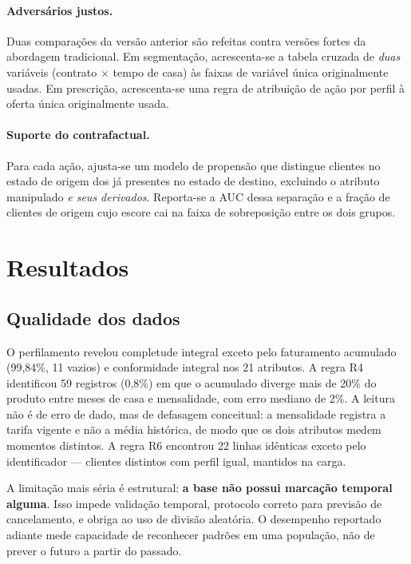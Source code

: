 \documentclass[10pt,a4paper]{article}
\begin{document}
\paragraph{Adversários justos.} Duas comparações da versão anterior são refeitas contra
versões fortes da abordagem tradicional. Em segmentação, acrescenta-se a tabela cruzada
de \emph{duas} variáveis (contrato \(\times\) tempo de casa) às faixas de variável única
originalmente usadas. Em prescrição, acrescenta-se uma regra de atribuição de ação por
perfil à oferta única originalmente usada.

\paragraph{Suporte do contrafactual.}
\label{sec:prescritiva}
Para cada ação, ajusta-se um modelo de propensão que distingue clientes no estado de
origem dos já presentes no estado de destino, excluindo o atributo manipulado \emph{e seus
derivados}. Reporta-se a AUC dessa separação e a fração de clientes de origem cujo escore
cai na faixa de sobreposição entre os dois grupos.

\section{Resultados}
\label{sec:resultados}

\subsection{Qualidade dos dados}

O perfilamento revelou completude integral exceto pelo faturamento acumulado (99,84\%, 11
vazios) e conformidade integral nos 21 atributos. A regra R4 identificou 59 registros (0,8\%)
em que o acumulado diverge mais de 20\% do produto entre meses de casa e mensalidade, com erro
mediano de 2\%. A leitura não é de erro de dado, mas de defasagem conceitual: a mensalidade
registra a tarifa vigente e não a média histórica, de modo que os dois atributos medem
momentos distintos. A regra R6 encontrou 22 linhas idênticas exceto pelo identificador ---
clientes distintos com perfil igual, mantidos na carga.

A limitação mais séria é estrutural: \textbf{a base não possui marcação temporal alguma}.
Isso impede validação temporal, protocolo correto para previsão de cancelamento, e obriga ao
uso de divisão aleatória. O desempenho reportado adiante mede capacidade de reconhecer padrões
em uma população, não de prever o futuro a partir do passado.
\end{document}

